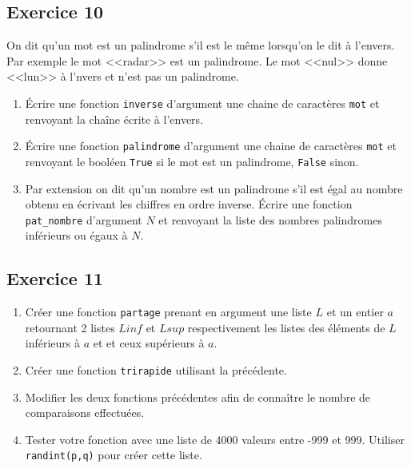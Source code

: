\documentclass[10pt,fleqn]{article} %
\begin{document}
\begin{multicols}{2}
\subsection*{Exercice 10}
On dit qu'un mot est un palindrome s'il est le même lorsqu'on le dit à l'envers. Par exemple le mot <<radar>> est un palindrome. Le mot <<nul>> donne <<lun>> à l'nvers et n'est pas un palindrome. 
\begin{enumerate}
\item Écrire une fonction \texttt{inverse} d'argument une chaine de caractères \texttt{mot} et renvoyant la chaîne écrite à l'envers. 
\item Écrire une fonction \texttt{palindrome} d'argument une chaine de caractères \texttt{mot} et renvoyant le booléen \texttt{True} si le mot est un palindrome, \texttt{False} sinon.
\item Par extension on dit qu'un nombre est un palindrome s'il est égal au nombre obtenu en écrivant les chiffres en ordre inverse. Écrire une fonction \texttt{pat\_nombre} d'argument $N$ et renvoyant la liste des nombres palindromes inférieurs ou égaux à $N$.
\end{enumerate}


\subsection*{Exercice 11}
\begin{enumerate}
\item Créer une fonction \texttt{partage} prenant en argument une liste $L$ et un entier $a$ retournant 2 listes $Linf$ et $Lsup$ respectivement les listes des éléments de $L$ inférieurs à $a$ et et ceux supérieurs à $a$.
\item Créer une fonction \texttt{trirapide} utilisant la précédente. 
\item Modifier les deux fonctions précédentes afin de connaître le nombre de comparaisons effectuées. 
\item Tester votre fonction avec une liste de 4000 valeurs entre -999 et 999. Utiliser \texttt{randint(p,q)} pour créer cette liste.
\end{enumerate}


\end{multicols}
\end{document}
